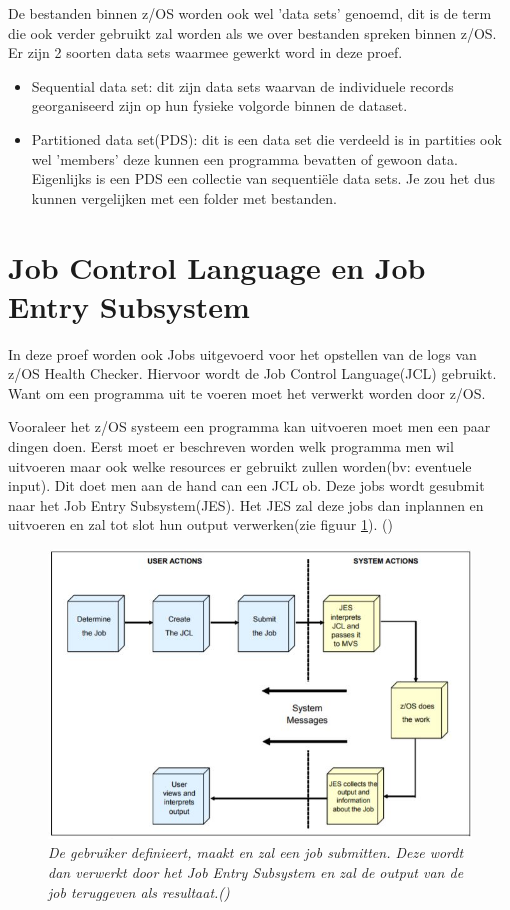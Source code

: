 De bestanden binnen z/OS worden ook wel 'data sets' genoemd, dit is de term die ook verder gebruikt zal worden als we over bestanden spreken binnen z/OS. Er zijn 2 soorten data sets waarmee gewerkt word in deze proef.

\begin{itemize}
	\item Sequential data set: dit zijn data sets waarvan de individuele records georganiseerd zijn op hun fysieke volgorde binnen de dataset.
	\item Partitioned data set(PDS): dit is een data set die verdeeld is in partities ook wel 'members' deze kunnen een programma bevatten of gewoon data. Eigenlijks is een PDS een collectie van sequentiële data sets. Je zou het dus kunnen vergelijken met een folder met bestanden.
\end{itemize}

\section{Job Control Language en Job Entry Subsystem}
\label{sec:Job Control Language en Job Entry Subsystem}

In deze proef worden ook Jobs uitgevoerd voor het opstellen van de logs van z/OS Health Checker. Hiervoor wordt de Job Control Language(JCL) gebruikt. Want om een programma uit te voeren moet het verwerkt worden door z/OS.

Vooraleer het z/OS systeem een programma kan uitvoeren moet men een paar dingen doen. Eerst moet er beschreven worden welk programma men wil uitvoeren maar ook welke resources er gebruikt zullen worden(bv: eventuele input). Dit doet men aan de hand can een JCL ob. Deze jobs wordt gesubmit naar het Job Entry Subsystem(JES). Het JES zal deze jobs dan inplannen en uitvoeren en zal tot slot hun output verwerken(zie figuur \ref{fig:jes}). (\cite{Cosimo2018})

\begin{figure}[h]
	\centering
	\includegraphics{img/JES}
	\caption[Visualisatie van JCL en JES]{{\small \textit{De gebruiker definieert, maakt en zal een job submitten. Deze wordt dan verwerkt door het Job Entry Subsystem en zal de output van de job teruggeven als resultaat.(\cite{Cosimo2018})}}}
	\label{fig:jes}
\end{figure}

